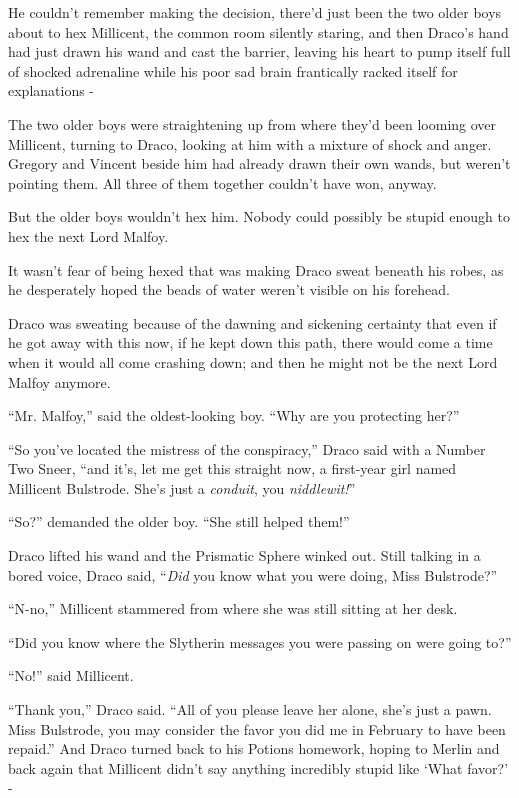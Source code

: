 He couldn't remember making the decision, there'd just been the two older boys about to hex Millicent, the common room silently staring, and then Draco's hand had just drawn his wand and cast the barrier, leaving his heart to pump itself full of shocked adrenaline while his poor sad brain frantically racked itself for explanations -

The two older boys were straightening up from where they'd been looming over Millicent, turning to Draco, looking at him with a mixture of shock and anger. Gregory and Vincent beside him had already drawn their own wands, but weren't pointing them. All three of them together couldn't have won, anyway.

But the older boys wouldn't hex him. Nobody could possibly be stupid enough to hex the next Lord Malfoy.

It wasn't fear of being hexed that was making Draco sweat beneath his robes, as he desperately hoped the beads of water weren't visible on his forehead.

Draco was sweating because of the dawning and sickening certainty that even if he got away with this now, if he kept down this path, there would come a time when it would all come crashing down; and then he might not be the next Lord Malfoy anymore.

``Mr. Malfoy,'' said the oldest-looking boy. ``Why are you protecting her?''

``So you've located the mistress of the conspiracy,'' Draco said with a Number Two Sneer, ``and it's, let me get this straight now, a first-year girl named Millicent Bulstrode. She's just a \emph{conduit}, you \emph{niddlewit!}''

``So?'' demanded the older boy. ``She still helped them!''

Draco lifted his wand and the Prismatic Sphere winked out. Still talking in a bored voice, Draco said, ``\emph{Did} you know what you were doing, Miss Bulstrode?''

``N-no,'' Millicent stammered from where she was still sitting at her desk.

``Did you know where the Slytherin messages you were passing on were going to?''

``No!'' said Millicent.

``Thank you,'' Draco said. ``All of you please leave her alone, she's just a pawn. Miss Bulstrode, you may consider the favor you did me in February to have been repaid.'' And Draco turned back to his Potions homework, hoping to Merlin and back again that Millicent didn't say anything incredibly stupid like `What favor?' -

